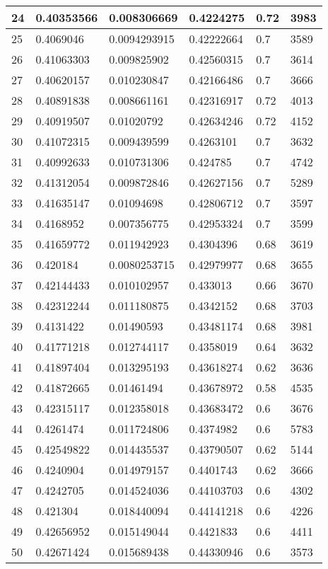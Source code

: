 \begin{longtable}{|l|l|l|l|l|l|}
24 & 0.40353566 & 0.008306669 & 0.4224275 & 0.72 & 3983 \\ \hline 
25 & 0.4069046 & 0.0094293915 & 0.42222664 & 0.7 & 3589 \\ \hline 
26 & 0.41063303 & 0.009825902 & 0.42560315 & 0.7 & 3614 \\ \hline 
27 & 0.40620157 & 0.010230847 & 0.42166486 & 0.7 & 3666 \\ \hline 
28 & 0.40891838 & 0.008661161 & 0.42316917 & 0.72 & 4013 \\ \hline 
29 & 0.40919507 & 0.01020792 & 0.42634246 & 0.72 & 4152 \\ \hline 
30 & 0.41072315 & 0.009439599 & 0.4263101 & 0.7 & 3632 \\ \hline 
31 & 0.40992633 & 0.010731306 & 0.424785 & 0.7 & 4742 \\ \hline 
32 & 0.41312054 & 0.009872846 & 0.42627156 & 0.7 & 5289 \\ \hline 
33 & 0.41635147 & 0.01094698 & 0.42806712 & 0.7 & 3597 \\ \hline 
34 & 0.4168952 & 0.007356775 & 0.42953324 & 0.7 & 3599 \\ \hline 
35 & 0.41659772 & 0.011942923 & 0.4304396 & 0.68 & 3619 \\ \hline 
36 & 0.420184 & 0.0080253715 & 0.42979977 & 0.68 & 3655 \\ \hline 
37 & 0.42144433 & 0.010102957 & 0.433013 & 0.66 & 3670 \\ \hline 
38 & 0.42312244 & 0.011180875 & 0.4342152 & 0.68 & 3703 \\ \hline 
39 & 0.4131422 & 0.01490593 & 0.43481174 & 0.68 & 3981 \\ \hline 
40 & 0.41771218 & 0.012744117 & 0.4358019 & 0.64 & 3632 \\ \hline 
41 & 0.41897404 & 0.013295193 & 0.43618274 & 0.62 & 3636 \\ \hline 
42 & 0.41872665 & 0.01461494 & 0.43678972 & 0.58 & 4535 \\ \hline 
43 & 0.42315117 & 0.012358018 & 0.43683472 & 0.6 & 3676 \\ \hline 
44 & 0.4261474 & 0.011724806 & 0.4374982 & 0.6 & 5783 \\ \hline 
45 & 0.42549822 & 0.014435537 & 0.43790507 & 0.62 & 5144 \\ \hline 
46 & 0.4240904 & 0.014979157 & 0.4401743 & 0.62 & 3666 \\ \hline 
47 & 0.4242705 & 0.014524036 & 0.44103703 & 0.6 & 4302 \\ \hline 
48 & 0.421304 & 0.018440094 & 0.44141218 & 0.6 & 4226 \\ \hline 
49 & 0.42656952 & 0.015149044 & 0.4421833 & 0.6 & 4411 \\ \hline 
50 & 0.42671424 & 0.015689438 & 0.44330946 & 0.6 & 3573 \\ \hline 
\end{longtable}